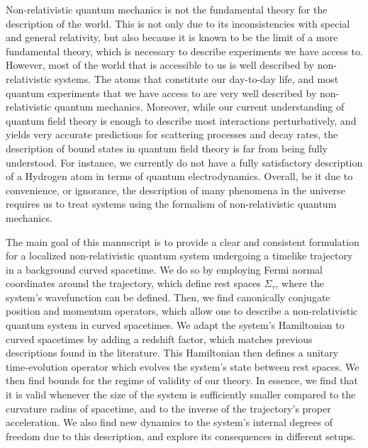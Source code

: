 \documentclass[prd,twocolumn,superscriptaddress,floatfix,amsmath,amssymb,amsfonts,longbibliography,nofootinbib]{revtex4-1}
\begin{document}
Non-relativistic quantum mechanics is not the fundamental theory for the description of the world. This is not only due to its inconsistencies with special and general relativity, but also because it is known to be the limit of a more fundamental theory, which is necessary to describe experiments we have access to. However, most of the world that is accessible to us is well described by non-relativistic systems. The atoms that constitute our day-to-day life, and most quantum experiments that we have access to are very well described by non-relativistic quantum mechanics. Moreover, while our current understanding of quantum field theory is enough to describe most interactions perturbatively, and yields very accurate predictions for scattering processes and decay rates, the description of bound states in quantum field theory is far from being fully understood. For instance, we currently do not have a fully satisfactory description of a Hydrogen atom in terms of quantum electrodynamics. Overall, be it due to convenience, or ignorance, the description of many phenomena in the universe requires us to treat systems using the formalism of non-relativistic quantum mechanics.

The main goal of this manuscript is to provide a clear and consistent formulation for a localized non-relativistic quantum system undergoing a timelike trajectory in a background curved spacetime. We do so by employing Fermi normal coordinates around the trajectory, which define rest spaces $\Sigma_\tau$, where the system's wavefunction can be defined. Then, we find canonically conjugate position and momentum operators, which allow one to describe a non-relativistic quantum system in curved spacetimes. We adapt the system's Hamiltonian to curved spacetimes by adding a redshift factor, which matches previous descriptions found in the literature. This Hamiltonian then defines a unitary time-evolution operator which evolves the system's state between rest spaces. We then find bounds for the regime of validity of our theory. In essence, we find that it is valid whenever the size of the system is sufficiently smaller compared to the curvature radius of spacetime, and to the inverse of the trajectory's proper acceleration. We also find new dynamics to the system's internal degrees of freedom due to this description, and explore its consequences in different setups. %
\end{document}
